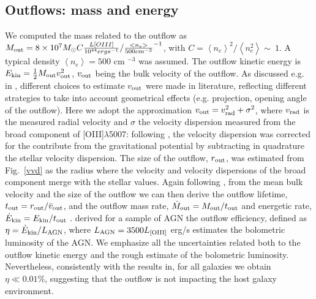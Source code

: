 \documentclass[fleqn,usenatbib]{mnras}
\begin{document}
 \citep[see e.g.][]{2015ApJ...806...84L}


\subsection{Outflows: mass and energy}

We computed the mass related to the outflow as \citep{2015A&A...580A.102C}
$M_{\rm out} = 8 \times 10^7 M_\odot C \frac{L[OIII]}{10^{44} erg s^{-1}}/\frac{<n_e>}{500 cm^{-3}}^{-1}$, with $C=\left<n_e\right>^2/\left<n_e^2\right> \sim ~ 1$. A typical density $\left<n_e\right> = 500$ cm $^{-3}$ was assumed.
The outflow kinetic energy is $E_{\rm kin} = \frac{1}{2} M_{\rm out} v^2_{\rm out}$, $v_{\rm out}$ being the bulk velocity of the outflow. As discussed e.g. in \cite{2016ApJ...833..171K}, different choices to estimate $v_{\rm out}$ were made in literature, reflecting different strategies to take into account geometrical effects (e.g. projection, opening angle of the outflow). Here we adopt the approximation \citep{2016ApJ...833..171K, 2018NatAs...2..198H} $v_{\rm out} = v^2_{\rm rad} +  \sigma^2$, where $v_{\rm rad}$ is the measured radial velocity and $\sigma$ the velocity dispersion measured from the broad component of [OIII]$\lambda$5007: following  \cite{2016ApJ...833..171K}, the velocity dispersion was corrected for the contribute from the gravitational potential by subtracting in quadrature the stellar velocity dispersion.  The size of the outflow, $r_{\rm out}$, was estimated from Fig.~\ref{vvd} as the radius where the velocity and velocity dispersions of the broad component merge with the stellar values. Again following \cite{2016ApJ...833..171K}, from the mean bulk velocity and the size of the outflow we can then derive the outflow lifetime, $t_{\rm out} = r_{\rm out}/\bar{v}_{\rm out}$, and the  outflow mass rate, $\dot{M}_{\rm out}=M_{\rm out}/t_{\rm out}$ and energetic rate,$\dot{E}_{\rm kin}=E_{\rm kin}/t_{\rm out}$ .
\citet{2015A&A...580A.102C} derived for a sample of AGN the outflow efficiency, defined as $\eta =  \dot{E}_{\rm kin}/L_{\rm AGN}$, where $L_{\rm AGN} = 3500 L_{\rm[OIII]}$ erg/s \citep{2004ApJ...613..109H} estimates the bolometric luminosity of the AGN. We emphasize all the uncertainties  related both to the outflow kinetic energy and the rough estimate of the bolometric luminosity. Nevertheless, consistently with the results in\citet{2015A&A...580A.102C},  for all galaxies we obtain $\eta \ll 0.01\%$, suggesting that the outflow is not impacting the host galaxy environment.
\end{document}
